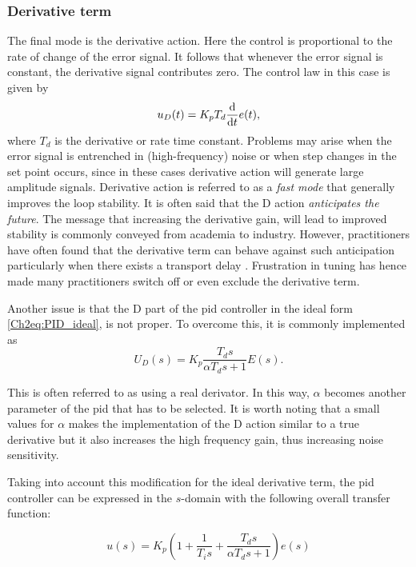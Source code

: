 \subsubsection*{Derivative term}
%
The final mode is the derivative  action. Here the control is proportional to the rate of change of the error signal. It follows that whenever the error signal is constant, the derivative signal contributes zero. The control law in this case is given by
\begin{equation*}
u_D(t) = K_pT_d \frac{\mathrm{d}}{\mathrm{d} t}e(t),
\end{equation*}
%
where $T_d$ is the derivative or rate time constant. Problems may arise when the error signal is entrenched in (high-frequency) noise or when step changes in the set point occurs, since in these cases derivative action will generate large amplitude signals. Derivative action is referred to as a \emph{fast mode} that generally improves the loop stability. It is often said that the D action \emph{anticipates the future}. The message that increasing the derivative gain, will lead to improved stability is commonly conveyed from academia to industry. However, practitioners have often found that the derivative term can behave against such anticipation particularly when there exists a transport delay \citep{VilanovaBook2012}. Frustration in tuning  has hence made many practitioners switch off or even exclude the derivative term.  

Another issue is that the D part of the \gls{pid} controller in the ideal form \eqref{Ch2eq:PID_ideal},  is not proper. To overcome this, it is commonly implemented as
\begin{equation*}
	U_D(s)= K_p\frac{T_ds}{\alpha T_d s+1} E(s).
\end{equation*}

This is often referred to as using a real derivator. In this way, $\alpha$ becomes another parameter of the \gls{pid} that has to be selected. It is worth noting that a small values for $\alpha$ makes the implementation of the D action similar to a true derivative but it also increases the high frequency gain, thus increasing noise sensitivity.

Taking into account this modification for the ideal derivative term, the \gls{pid} controller can be expressed in the $s$-domain with the following overall transfer function:

\begin{equation}
u(s)=K_p \left ( 1+\frac{1}{T_is}+\frac{T_ds}{\alpha T_d s+1} \right )  e(s)
\end{equation}

